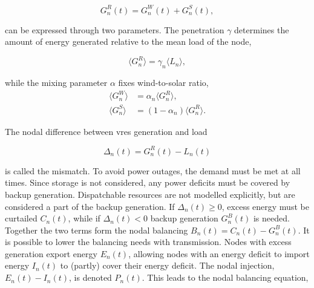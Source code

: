 \documentclass[a4paper, 5p, sort&compress]{elsarticle}%
\newcommand{\mean}[1]{\langle #1 \rangle}
\newcommand{\paren}[1]{\left(#1\right)}
\begin{document}
\begin{equation}
  G^{R}_{n}(t) = G_{n}^{W}(t) + G_{n}^{S}(t),
\end{equation}

can be expressed through two parameters. The penetration $\gamma$
determines the amount of energy generated relative to the mean load of
the node,

\begin{equation}
  \mean{G^{R}_{n}} = \gamma_{n} \mean{L_{n}} ,
\end{equation}

while the mixing parameter $\alpha$ fixes wind-to-solar ratio,
\begin{align}
  \mean{G^{W}_{n}} &=  \alpha_{n} \mean{G_{n}^{R}}  , \\
  \mean{G^{S}_{n}} &=  \paren{1- \alpha_{n}} \mean{G_{n}^{R}}  .
\end{align}

The nodal difference between \gls{vres} generation and load

\begin{equation}
  \Delta_{n}(t) = G^{R}_{n}(t) - L_{n}(t)
\end{equation}

is called the mismatch. To avoid power outages, the demand must be
met at all times. Since storage is not considered, any power
deficits must be covered by backup generation. Dispatchable
resources are not modelled explicitly, but are considered a part of
the backup generation. If $\Delta_{n}(t) \geq 0$, excess energy must be
curtailed $C_{n}(t)$, while if $\Delta_{n}(t) < 0$ backup generation
$G^{B}_{n}(t)$ is needed.
Together the two terms form the nodal balancing
$B_{n}(t) = C_{n}(t) - G^{B}_{n}(t)$.
%
It is possible to lower the balancing needs with transmission. Nodes
with excess generation export energy $E_{n}(t)$, allowing nodes with
an energy deficit to import energy $I_{n}(t)$ to (partly) cover their
energy deficit. The nodal injection, $E_{n}(t) - I_{n}(t)$, is denoted
$P_{n}(t)$. This leads to the nodal balancing equation,
\end{document}
